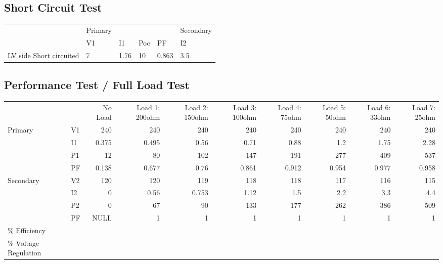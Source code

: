 \documentclass[11pt]{article}
\begin{document}
\subsection{Short Circuit Test}
\label{sec:org357fc2b}

\begin{center}
\begin{tabular}{llllll}
 & Primary &  &  &  & Secondary\\
 & V1 & I1 & Poc & PF & I2\\
LV side Short circuited & 7 & 1.76 & 10 & 0.863 & 3.5\\
\end{tabular}
\end{center}
\subsection{Performance Test / Full Load Test}
\label{sec:orga4f40b2}
\begin{center}
\begin{tabular}{llrrrrrrrr}
 &  & No Load & Load 1: 200ohm & Load 2: 150ohm & Load 3: 100ohm & Load 4: 75ohm & Load 5: 50ohm & Load 6: 33ohm & Load 7: 25ohm\\
Primary & V1 & 240 & 240 & 240 & 240 & 240 & 240 & 240 & 240\\
 & I1 & 0.375 & 0.495 & 0.56 & 0.71 & 0.88 & 1.2 & 1.75 & 2.28\\
 & P1 & 12 & 80 & 102 & 147 & 191 & 277 & 409 & 537\\
 & PF & 0.138 & 0.677 & 0.76 & 0.861 & 0.912 & 0.954 & 0.977 & 0.958\\
Secondary & V2 & 120 & 120 & 119 & 118 & 118 & 117 & 116 & 115\\
 & I2 & 0 & 0.56 & 0.753 & 1.12 & 1.5 & 2.2 & 3.3 & 4.4\\
 & P2 & 0 & 67 & 90 & 133 & 177 & 262 & 386 & 509\\
 & PF & NULL & 1 & 1 & 1 & 1 & 1 & 1 & 1\\
\% Efficiency &  &  &  &  &  &  &  &  & \\
\% Voltage Regulation &  &  &  &  &  &  &  &  & \\
\end{tabular}
\end{center}
\end{document}
